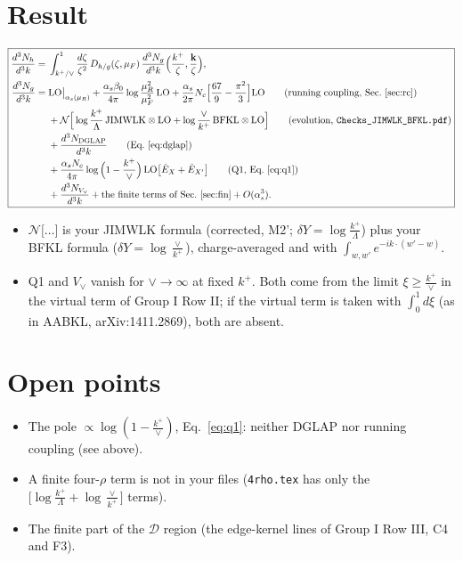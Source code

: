 \documentclass[10pt]{article}
\numberwithin{equation}{section}
\begin{document}
\section{Result}\label{sec:res}
\begin{equation}
\boxed{\begin{aligned}
\frac{d^3N_h}{d^3k}={}&\int_{k^+/\vee}^1\frac{d\zeta}{\zeta^2}\,D_{h/g}(\zeta,\mu_F)\,\frac{d^3N_g}{d^3k}\Big(\frac{k^+}{\zeta},\frac{\mathbf k}{\zeta}\Big),\\
\frac{d^3N_g}{d^3k}={}&{\rm LO}\big|_{\alpha_s(\mu_R)}+\frac{\alpha_s\beta_0}{4\pi}\log\frac{\mu_R^2}{\mu_F^2}\,{\rm LO}+\frac{\alpha_s}{2\pi}N_c\Big[\frac{67}{9}-\frac{\pi^2}{3}\Big]{\rm LO}\qquad\text{(running coupling, Sec.~\ref{sec:rc})}\\
&+\mathcal N\Big[\log\frac{k^+}{\Lambda}\,{\rm JIMWLK}\otimes{\rm LO}+\log\frac{\vee}{k^+}\,{\rm BFKL}\otimes{\rm LO}\Big]\qquad\text{(evolution, \texttt{Checks\_JIMWLK\_BFKL.pdf})}\\
&+\frac{d^3N_{\rm DGLAP}}{d^3k}\qquad\text{(Eq.~\eqref{eq:dglap})}\\
&+\frac{\alpha_sN_c}{4\pi}\log\Big(1-\frac{k^+}{\vee}\Big)\,{\rm LO}\big[\hat E_X+\hat E_{X'}\big]\qquad\text{(Q1, Eq.~\eqref{eq:q1})}\\
&+\frac{d^3N_{V_\vee}}{d^3k}+\text{the finite terms of Sec.~\ref{sec:fin}}+O(\alpha_s^3).
\end{aligned}}
\label{eq:result}
\end{equation}
\begin{itemize}
\item $\mathcal N\big[\dots\big]$ is your JIMWLK formula (corrected, M2'; $\delta Y=\log\frac{k^+}{\Lambda}$) plus your BFKL formula ($\delta Y=\log\frac{\vee}{k^+}$), charge-averaged and with $\int_{w,w'}e^{-ik\cdot(w'-w)}$.
\item Q1 and $V_\vee$ vanish for $\vee\to\infty$ at fixed $k^+$. Both come from the limit $\xi\ge\frac{k^+}{\vee}$ in the virtual term of Group I Row II; if the virtual term is taken with $\int_0^1d\xi$ (as in AABKL, arXiv:1411.2869), both are absent.
\end{itemize}

\section{Open points}\label{sec:open}
\begin{itemize}
\item[Q1] The pole $\propto\log(1-\frac{k^+}{\vee})$, Eq.~\eqref{eq:q1}: neither DGLAP nor running coupling (see above).
\item[Q2] A finite four-$\rho$ term is not in your files (\texttt{4rho.tex} has only the $\big[\log\frac{k^+}{\Lambda}+\log\frac{\vee}{k^+}\big]$ terms).
\item[Q3] The finite part of the $\mathcal D$ region (the edge-kernel lines of Group I Row III, C4 and F3).
\end{itemize}
\end{document}
